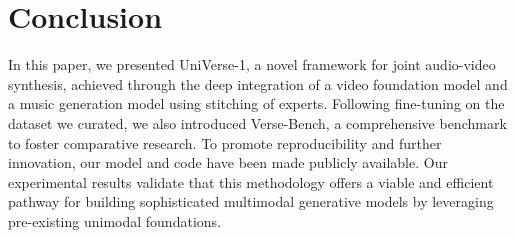 \section{Conclusion}

In this paper, we presented UniVerse-1, a novel framework for joint audio-video synthesis, achieved through the deep integration of a video foundation model and a music generation model using stitching of experts. Following fine-tuning on the dataset we curated, we also introduced Verse-Bench, a comprehensive benchmark to foster comparative research. To promote reproducibility and further innovation, our model and code have been made publicly available. Our experimental results validate that this methodology offers a viable and efficient pathway for building sophisticated multimodal generative models by leveraging pre-existing unimodal foundations.